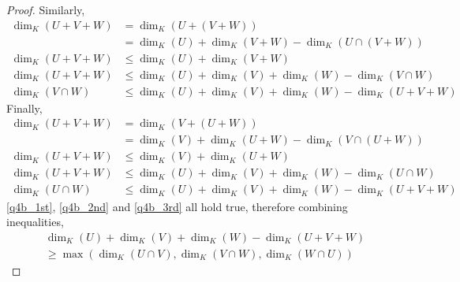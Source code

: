 \documentclass[11pt]{article}
\theoremstyle{definition}
\numberwithin{lemma}{problem}
\numberwithin{equation}{problem}
\renewcommand{\geq}{\geqslant}
\renewcommand{\leq}{\leqslant}
\begin{document}
\begin{proof}
    Similarly,
    \begin{align}
        \dim_K(U+V+W) &= \dim_K(U+(V+W))   \nonumber\\
        &= \dim_K(U) + \dim_K(V+W) - \dim_K(U\cap(V+W)) \nonumber\\
        \dim_K(U+V+W) &\leq \dim_K(U) + \dim_K(V+W) \nonumber \\
        \dim_K(U+V+W) &\leq \dim_K(U) + \dim_K(V) + \dim_K(W) - \dim_K(V\cap W) \nonumber \\
        \dim_K(V\cap W) &\leq \dim_K(U) + \dim_K(V) + \dim_K(W) - \dim_K(U+V+W)    \label{q4b_2nd}
    \end{align}
    Finally,
    \begin{align}
        \dim_K(U+V+W) &= \dim_K(V+(U+W))   \nonumber\\
        &= \dim_K(V) + \dim_K(U+W) - \dim_K(V\cap(U+W)) \nonumber\\
        \dim_K(U+V+W) &\leq \dim_K(V) + \dim_K(U+W) \nonumber \\
        \dim_K(U+V+W) &\leq \dim_K(U) + \dim_K(V) + \dim_K(W) - \dim_K(U\cap W) \nonumber \\
        \dim_K(U\cap W) &\leq \dim_K(U) + \dim_K(V) + \dim_K(W) - \dim_K(U+V+W)    \label{q4b_3rd}
    \end{align}
    \eqref{q4b_1st}, \eqref{q4b_2nd} and \eqref{q4b_3rd} all hold true, therefore
    combining inequalities,
    \begin{align*}
        \dim_K(U) + \dim_K(V) + \dim_K(W) - \dim_K(U + V + W)   \\
        \geq \max\left(
            \dim_K(U\cap V), \dim_K(V\cap W), \dim_K(W\cap U)
        \right)\tag*{\qedhere}
    \end{align*}
\end{proof}
\end{document}
